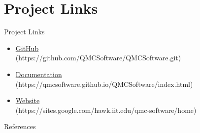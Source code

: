 \documentclass[11pt]{beamer}
\begin{document}
\section{Project Links}
\begin{frame}{Project Links}
    \cite{qmcpy}
    \begin{itemize}
        \item \href{https://github.com/QMCSoftware/QMCSoftware.git}{GitHub}\\
            (https://github.com/QMCSoftware/QMCSoftware.git)
        \item \href{https://qmcsoftware.github.io/QMCSoftware/index.html}{Documentation}\\
            (https://qmcsoftware.github.io/QMCSoftware/index.html)
        \item \href{https://sites.google.com/hawk.iit.edu/qmc-software/home}{Website}\\
            (https://sites.google.com/hawk.iit.edu/qmc-software/home)
    \end{itemize}
\end{frame}


\begin{frame}[allowframebreaks]{References}
    
    
\end{frame}
\end{document}
